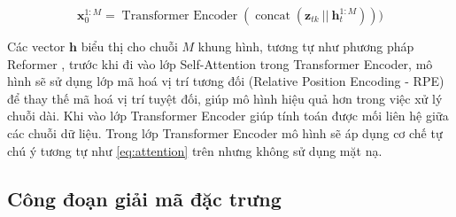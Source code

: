 \begin{equation}
	\mathbf{x}^{1:M}_{0}  = \operatorname{Transformer\ Encoder}( \operatorname{concat}( \mathbf{z}_{tk} \ ||\  \mathbf{h}^{1:M}_{t}  )))
	\label{eq:TransformerEncoder}
\end{equation}


Các vector $\mathbf{h}$ biểu thị cho chuỗi $M$ khung hình, tương tự như phương pháp Reformer \cite{kitaev2020reformer}, trước khi đi vào lớp Self-Attention trong Transformer Encoder, mô hình sẽ sử dụng lớp mã hoá vị trí tương đối (Relative Position Encoding - RPE) để thay thế mã hoá vị trí tuyệt đối, giúp mô hình hiệu quả hơn trong việc xử lý chuỗi dài.
Khi vào lớp Transformer Encoder \cite{vaswani2017attention} giúp tính toán được mối liên hệ giữa các chuỗi dữ liệu. 
Trong lớp Transformer Encoder mô hình sẽ áp dụng cơ chế tự chú ý tương tự như \autoref{eq:attention} trên nhưng không sử dụng mặt nạ. 












\subsection{Công đoạn giải mã đặc trưng}

